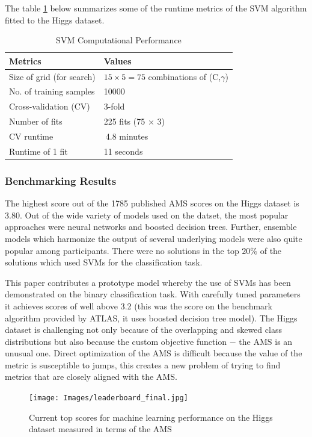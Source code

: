 \documentclass[final,3p,times,twocolumn]{elsarticle}
\begin{document}
The table \ref{cp} below summarizes some of the runtime metrics of the SVM algorithm fitted to the Higgs dataset. 

\begin{table}
\hspace{-1cm}
\begin{tabular}{l|l}
Metrics & Values  \\
\toprule
Size of grid (for search) & $15 \times 5 = 75$ combinations of (C,$\gamma$) \\
No. of training samples & 10000 \\
Cross-validation (CV) & 3-fold  \\
Number of fits & 225 fits (75 $\times$ 3) \\
CV runtime &  $~$4.8 minutes\\
Runtime of 1 fit &  11 seconds  \\
\end{tabular}
\caption{SVM Computational Performance}
\label{cp}
\end{table}

\subsubsection{Benchmarking Results}

The highest score out of the 1785 published AMS scores on the Higgs dataset is 3.80. Out of the wide variety of models used on the datset, the most popular approaches were neural networks and boosted decision trees. Further, ensemble models which harmonize the output of several underlying models were also quite popular among participants. There were no solutions in the top $20\%$ of the solutions which used SVMs for the classification task. 

This paper contributes a prototype model whereby the use of SVMs has been demonstrated on the binary classification task. With carefully tuned parameters it achieves scores of well above 3.2 (this was the score on the benchmark algorithm provided by ATLAS, it uses boosted decision tree model). The Higgs dataset is challenging not only because of the overlapping and skewed class distributions but also because the custom objective function $-$ the AMS is an unusual one. Direct optimization of the AMS is difficult because the value of the metric is susceptible to jumps, this creates a new problem of trying to find metrics that are closely aligned with the AMS.   

\begin{figure}
\hspace{-0.7cm}
\texttt{[image: Images/leaderboard\_final.jpg]} \\
\caption{Current top scores for machine learning performance on the Higgs dataset measured in terms of the AMS}
\end{figure}
\end{document}
